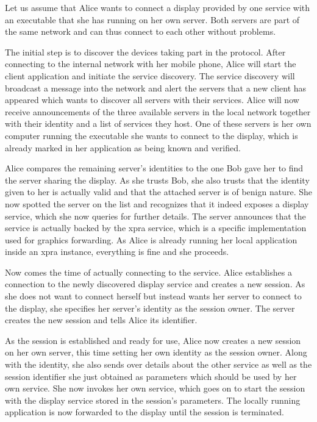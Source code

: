 Let us assume that Alice wants to connect a display provided by one service with an executable that she has running on her own server.
Both servers are part of the same network and can thus connect to each other without problems.

The initial step is to discover the devices taking part in the protocol.
After connecting to the internal network with her mobile phone, Alice will start the client application and initiate the service discovery.
The service discovery will broadcast a message into the network and alert the servers that a new client has appeared which wants to discover all servers with their services.
Alice will now receive announcements of the three available servers in the local network together with their identity and a list of services they host.
One of these servers is her own computer running the executable she wants to connect to the display, which is already marked in her application as being known and verified.

Alice compares the remaining server's identities to the one Bob gave her to find the server sharing the display.
As she trusts Bob, she also trusts that the identity given to her is actually valid and that the attached server is of benign nature.
She now spotted the server on the list and recognizes that it indeed exposes a display service, which she now queries for further details.
The server announces that the service is actually backed by the xpra service, which is a specific implementation used for graphics forwarding.
As Alice is already running her local application inside an xpra instance, everything is fine and she proceeds.

Now comes the time of actually connecting to the service.
Alice establishes a connection to the newly discovered display service and creates a new session.
As she does not want to connect herself but instead wants her server to connect to the display, she specifies her server's identity as the session owner.
The server creates the new session and tells Alice its identifier.

As the session is established and ready for use, Alice now creates a new session on her own server, this time setting her own identity as the session owner.
Along with the identity, she also sends over details about the other service as well as the session identifier she just obtained as parameters which should be used by her own service.
She now invokes her own service, which goes on to start the session with the display service stored in the session's parameters.
The locally running application is now forwarded to the display until the session is terminated.

